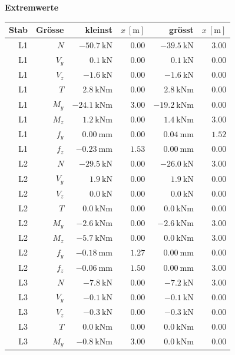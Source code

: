 \documentclass[11pt,a4paper]{article}
\begin{document}
\noindent\textbf{Extremwerte}
\begin{longtable}{rrrrrr}
\hline
Stab & Grösse & kleinst & $x\ [\mathrm{m}]$ & grösst & $x\ [\mathrm{m}]$ \\
\hline
\endhead
L1 & $N$ & $-50.7\ \mathrm{kN}$ & $0.00$ & $-39.5\ \mathrm{kN}$ & $3.00$ \\
L1 & $V_y$ & $0.1\ \mathrm{kN}$ & $0.00$ & $0.1\ \mathrm{kN}$ & $0.00$ \\
L1 & $V_z$ & $-1.6\ \mathrm{kN}$ & $0.00$ & $-1.6\ \mathrm{kN}$ & $0.00$ \\
L1 & $T$ & $2.8\ \mathrm{kNm}$ & $0.00$ & $2.8\ \mathrm{kNm}$ & $0.00$ \\
L1 & $M_y$ & $-24.1\ \mathrm{kNm}$ & $3.00$ & $-19.2\ \mathrm{kNm}$ & $0.00$ \\
L1 & $M_z$ & $1.2\ \mathrm{kNm}$ & $0.00$ & $1.4\ \mathrm{kNm}$ & $3.00$ \\
L1 & $f_y$ & $0.00\ \mathrm{mm}$ & $0.00$ & $0.04\ \mathrm{mm}$ & $1.52$ \\
L1 & $f_z$ & $-0.23\ \mathrm{mm}$ & $1.53$ & $0.00\ \mathrm{mm}$ & $0.00$ \\
L2 & $N$ & $-29.5\ \mathrm{kN}$ & $0.00$ & $-26.0\ \mathrm{kN}$ & $3.00$ \\
L2 & $V_y$ & $1.9\ \mathrm{kN}$ & $0.00$ & $1.9\ \mathrm{kN}$ & $0.00$ \\
L2 & $V_z$ & $0.0\ \mathrm{kN}$ & $0.00$ & $0.0\ \mathrm{kN}$ & $0.00$ \\
L2 & $T$ & $0.0\ \mathrm{kNm}$ & $0.00$ & $0.0\ \mathrm{kNm}$ & $0.00$ \\
L2 & $M_y$ & $-2.6\ \mathrm{kNm}$ & $0.00$ & $-2.6\ \mathrm{kNm}$ & $3.00$ \\
L2 & $M_z$ & $-5.7\ \mathrm{kNm}$ & $0.00$ & $0.0\ \mathrm{kNm}$ & $3.00$ \\
L2 & $f_y$ & $-0.18\ \mathrm{mm}$ & $1.27$ & $0.00\ \mathrm{mm}$ & $0.00$ \\
L2 & $f_z$ & $-0.06\ \mathrm{mm}$ & $1.50$ & $0.00\ \mathrm{mm}$ & $3.00$ \\
L3 & $N$ & $-7.8\ \mathrm{kN}$ & $0.00$ & $-7.2\ \mathrm{kN}$ & $3.00$ \\
L3 & $V_y$ & $-0.1\ \mathrm{kN}$ & $0.00$ & $-0.1\ \mathrm{kN}$ & $0.00$ \\
L3 & $V_z$ & $-0.3\ \mathrm{kN}$ & $0.00$ & $-0.3\ \mathrm{kN}$ & $0.00$ \\
L3 & $T$ & $0.0\ \mathrm{kNm}$ & $0.00$ & $0.0\ \mathrm{kNm}$ & $0.00$ \\
L3 & $M_y$ & $-0.8\ \mathrm{kNm}$ & $3.00$ & $0.0\ \mathrm{kNm}$ & $0.00$ \\

\end{longtable}
\end{document}
